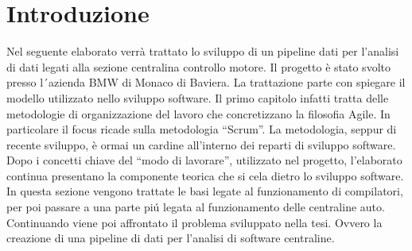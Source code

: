 \documentclass[../main.tex]{subfiles}
\begin{document}
\section{Introduzione}
Nel seguente elaborato verrà trattato lo sviluppo di un pipeline dati per l'analisi di dati legati alla sezione centralina controllo motore. 
Il progetto è stato svolto presso l´azienda BMW di Monaco di Baviera. 
La trattazione parte con spiegare il modello utilizzato nello sviluppo software. Il primo capitolo infatti tratta delle metodologie di organizzazione del lavoro che concretizzano la filosofia Agile. In particolare il focus ricade sulla metodologia “Scrum”. La metodologia, seppur di recente sviluppo, è ormai un cardine all'interno dei reparti di sviluppo software. 
Dopo i concetti chiave del “modo di lavorare”, utilizzato nel progetto, l'elaborato continua presentano la componente teorica che si cela dietro lo sviluppo software. In questa sezione vengono trattate le basi legate al funzionamento di compilatori, per poi passare a una parte piú legata al funzionamento delle centraline auto. 
Continuando viene poi affrontato il problema sviluppato nella tesi. Ovvero la creazione di una pipeline di dati per l'analisi di software centraline. 
\end{document}
